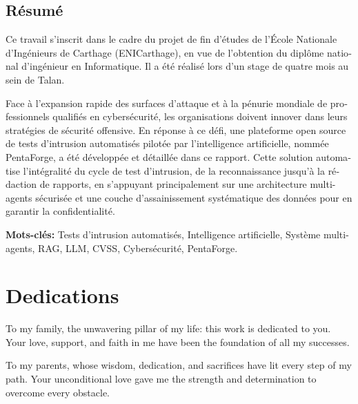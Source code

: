 \documentclass[12pt,a4paper]{report}
\begin{document}
\begin{french}
\section*{R\'{e}sum\'{e}}

Ce travail s'inscrit dans le cadre du projet de fin d'\'{e}tudes de l'\'{E}cole Nationale
d'Ing\'{e}nieurs de Carthage (ENICarthage), en vue de l'obtention du dipl\^{o}me national
d'ing\'{e}nieur en Informatique. Il a \'{e}t\'{e} r\'{e}alis\'{e} lors d'un stage de quatre mois au sein de Talan.

Face à l'expansion rapide des surfaces d'attaque et à la pénurie mondiale de professionnels qualifiés en cybersécurité, les organisations doivent innover dans leurs stratégies de sécurité offensive. En réponse à ce défi, une plateforme open source de tests d'intrusion automatisés pilotée par l'intelligence artificielle, nommée PentaForge, a été développée et détaillée dans ce rapport. Cette solution automatise l'intégralité du cycle de test d'intrusion, de la reconnaissance jusqu'à la rédaction de rapports, en s'appuyant principalement sur une architecture multi-agents sécurisée et une couche d'assainissement systématique des données pour en garantir la confidentialité.

\vspace{0.4cm}
\noindent \textbf{Mots-cl\'{e}s:} Tests d'intrusion automatis\'{e}s, Intelligence artificielle,
Syst\`{e}me multi-agents, RAG, LLM, CVSS, Cybers\'{e}curit\'{e}, PentaForge.
\end{french}
\newpage
\thispagestyle{fancy}
\section*{Dedications}

\vspace{1.2cm}

To my family, the unwavering pillar of my life: this work is dedicated to you.
Your love, support, and faith in me have been the foundation of all my successes.

\vspace{1cm}

To my parents, whose wisdom, dedication, and sacrifices have lit every step of my path.
Your unconditional love gave me the strength and determination to overcome every obstacle.

\vspace{1cm}
\end{document}
